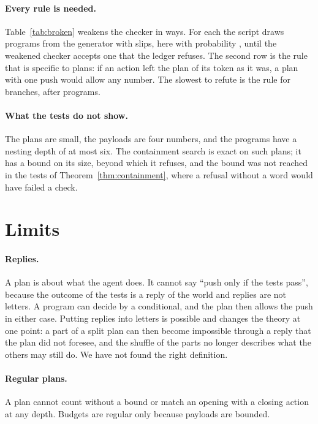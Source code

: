 \documentclass[acmsmall,nonacm,screen]{acmart}
\begin{document}
\paragraph{Every rule is needed.} Table~\ref{tab:broken} weakens the checker in \exRules{}
ways. For each the script draws programs from the generator with slips, here with
probability \exSlipBroken{}, until the weakened checker accepts one that the ledger refuses.
The second row is the rule that is specific to plans: if an action left the plan of its token
as it was, a plan with one push would allow any number. The slowest to refute is the rule for
branches, after \exSlowest{} programs.

\paragraph{What the tests do not show.} The plans are small, the payloads are four numbers,
and the programs have a nesting depth of at most six. The containment search is exact on
such plans; it has a bound on its size, beyond which it refuses, and the bound was not
reached in the tests of Theorem~\ref{thm:containment}, where a refusal without a word would
have failed a check.

\section{Limits}
\label{sec:limits}

\paragraph{Replies.} A plan is about what the agent does. It cannot say ``push only if the
tests pass'', because the outcome of the tests is a reply of the world and replies are not
letters. A program can decide by a conditional, and the plan then allows the push in either
case. Putting replies into letters is possible and changes the theory at one point: a part of
a split plan can then become impossible through a reply that the plan did not foresee, and
the shuffle of the parts no longer describes what the others may still do. We have not found
the right definition.

\paragraph{Regular plans.} A plan cannot count without a bound or match an opening with a
closing action at any depth. Budgets are regular only because payloads are bounded.
\end{document}
